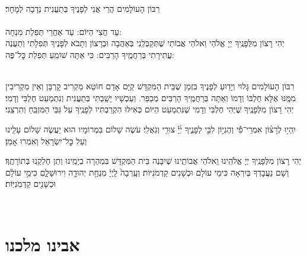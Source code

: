 \documentclass[twoside, openany, parskip=half, 11pt]{book}
\begin{document}
\begin{sometimes}

\\
רִבּוֹן הָעוֹלָמִים הֲרֵי אֲנִי לְפָנֶיךָ בְּתַעֲנִית נְדָבָה לְמָחָר׃\\
\\
עַד חֲצִי הַיּוֹם:  עַד אַחֲרֵי תְּפִלַת מִנְחָה:\\
יְהִי רָצוֹן מִלְּפָנֶֽיךָ יְיָ אֱלֹהַי וֵאלֹהֵי אֲבוֹתַי שֶׁתְּקַבְּלֵֽנִי בְּאַהֲבָה וּבְרָצוֹן וְתָבֹא לְפָנֶיךָ תְּפִלָתִי
וְתַעֲנֶה עֲתִירָתִי בְּרַחֲמֶֽיךָ הָרַבִּים: כִּי אַתָּה שׁוֹמֵֽעַ תְּפִלַת כׇּל־פֶּה: 

\sepline

\\
רִבּוֹן הָעוֹלָמִים גָּלוּי וְיָדֽוּעַ לְפָנֶיךָ בִּזְמַן שֶׁבֵּית הַמִּקְדָּשׁ קַיָּם אָדָם חוֹטֵא מַקְרִיב קׇרְבָּן וְאֵין מַקְרִיבִין מִמֶּֽנּוּ אֶלָּא חֶלְבּוֹ וְדָמוֹ וְאַתָּה בְּרַחֲמֶֽיךָ הָרַבִּים מְכַפֵּר. וְעַכְשָׁיו יָשַֽׁבְתִּי בְּתַעֲנִית וְנִתְמַעֵט חֶלְבִּי וְדָמִי׃ יְהִי רָצוֹן מִלְּפָנֶֽיךָ שֶׁיְּהִי חֶלְבִּי וְדָמִי שֶׁנִּתְמַעַט הַיּוֹם כְּאִילּוּ הִקְרַבְתִּיו לְפָנֶֽיךָ עַל גַּבֵּי הַמִּזְבֵּֽחַ וְתִרְצֵֽנִי׃


\end{sometimes}

יִֽהְי֥וּ לְרָצ֨וֹן אִמְרֵי־פִ֡י וְהֶגְי֣וֹן לִבִּ֣י לְפָנֶ֑יךָ יְ֜יָ֗ צוּרִ֥י וְגֹֽאֲלִֽי׃ עֹשֶׂה שָׁלוֹם בִּמְרוֹמָיו הוּא יַעֲשֶׂה שָׁלוֹם עָלֵֽינוּ וְעַל כׇּל־יִשְׂרָאֵל וְאִמְרוּ אָמֵן׃


\begin{small}

יְהִי רָצוֹן מִלְּפָנֶֽיךָ יְיָ אֱלֹהֵֽינוּ וִֵאלֹהֵי אֲבוֹתֵֽינוּ שֶׁיִבָּנֶה בֵּית הַמִּקְדָּשׁ בִּמְהֵרָה בְיָמֵֽינוּ וְתֵן חֶלְקֵֽנוּ בְּתוֹרָתֶֽךָ׃ וְשָׁם נַעֲבׇדְךָ בְּיִרְאָה כִּימֵי עוֹלָם וּכְשָׁנִים קַדְמֹנִיּוֹת׃
וְעָֽרְבָה֙ לַֽיְיָ֔ מִנְחַ֥ת יְהוּדָ֖ה וִירוּשָׁלָ֑םִ כִּימֵ֣י עוֹלָ֔ם וּכְשָׁנִ֖ים קַדְמֹֽנִיּֽוֹת׃


\end{small}



\\

\section[אבינו מלכנו]{ אבינו מלכנו }
\end{document}
